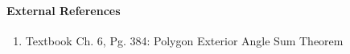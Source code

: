 \documentclass[letterpaper,12pt,twoside]{report}
\begin{document}
	\paragraph{External References}
	
	\begin{enumerate}
		\item Textbook Ch. 6, Pg. 384: Polygon Exterior Angle Sum Theorem
	\end{enumerate}
	
\end{document}
